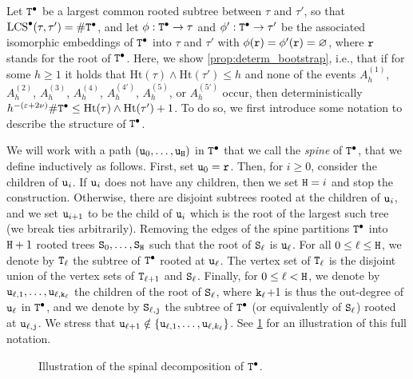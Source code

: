 \documentclass[11pt,reqno]{amsart}
\newcommand{\Ht}{\mathrm{Ht}}
\newcommand{\LCS}{\operatorname{LCS}}
\newcommand{\eps}{\varepsilon}
\renewcommand{\emptyset}{\varnothing}
\begin{document}
Let $\mathtt{T}^\bullet$ be a largest common rooted subtree between $\tau$ and $\tau'$, so that $\LCS^\bullet(\tau,\tau')=\#\ttT^\bullet$, and let $\phi:\mathtt{T}^\bullet\rightarrow \tau$ and $\phi':\mathtt{T}^\bullet\rightarrow \tau'$ be the associated isomorphic embeddings of $\mathtt{T}^\bullet$ into $\tau$ and $\tau'$ with $\phi(\ttr) = \phi'(\ttr) = \emptyset$, where $\mathtt{r}$ stands for the root of $\mathtt{T}^\bullet$. Here, we show \cref{prop:determ_bootstrap}, i.e., that if for some $h\geq 1$ it holds that $\Ht(\tau)\wedge\Ht(\tau')\leq h$ and none of the events $A_h^{(1)}$, $A_h^{(2)}$, $A_h^{(3)}$, $A_h^{(4)}$, $A_h^{(4')}$, $A_h^{(5)}$, or $A_h^{(5')}$ occur, then deterministically $h^{-(\eps+2\nu)}\#\ttT^\bullet \leq \Ht(\tau)\wedge\Ht(\tau')+1$. To do so, we first introduce some notation to describe the structure of $\mathtt{T}^\bullet$.

We will work with a path $(\mathtt{u}_0,\ldots,\mathtt{u}_{\mathtt{H}})$ in $\mathtt{T}^\bullet$ that we call the \emph{spine} of $\mathtt{T}^\bullet$, that we define inductively as follows. First, set $\mathtt{u}_0 = \mathtt{r}$. Then, for $i \geq 0$, consider the children of $\mathtt{u}_i$. If $\mathtt{u}_i$ does not have any children, then we set $\mathtt{H} = i$ and stop the construction. Otherwise, there are disjoint subtrees rooted at the children of $\mathtt{u}_i$, and we set $\mathtt{u}_{i+1}$ to be the child of $\mathtt{u}_i$ which is the root of the largest such tree (we break ties arbitrarily). Removing the edges of the spine partitions $\mathtt{T}^\bullet$ into $\mathtt{H}+1$ rooted trees $\mathtt{S}_0,\ldots,\mathtt{S}_{\mathtt{H}}$ such that the root of $\mathtt{S}_\ell$ is $\mathtt{u}_\ell$. For all $0\leq \ell \leq \mathtt{H}$, we denote by $\mathtt{T}_\ell$ the subtree of $\mathtt{T}^\bullet$ rooted at $\mathtt{u}_\ell$. The vertex set of $\mathtt{T}_\ell$ is the disjoint union of the vertex sets of $\mathtt{T}_{\ell+1}$ and $\mathtt{S}_\ell$. Finally, for $0 \le \ell < \mathtt{H}$, we denote by $\mathtt{u}_{\ell,1},\ldots,\mathtt{u}_{\ell,\mathtt{k}_\ell}$ the children of the root of $\mathtt{S}_\ell$, where $\mathtt{k}_\ell$+1 is thus the out-degree of $\mathtt{u}_\ell$ in $\mathtt{T}^\bullet$, and we denote by $\mathtt{S}_{\ell,\mathtt{j}}$ the subtree of $\mathtt{T}^\bullet$ (or equivalently of $\mathtt{S}_\ell$) rooted at $\mathtt{u}_{\ell,\mathtt{j}}$. We stress that $\mathtt{u}_{\ell+1} \notin \{\mathtt{u}_{\ell,1},\ldots,\mathtt{u}_{\ell,k_\ell}\}$. See \cref{fig:Tdot-spine} for an illustration of this full notation.

\begin{figure}
    \centering
    
    \caption{Illustration of the spinal decomposition of $\mathtt{T}^\bullet$.}
    \label{fig:Tdot-spine}
\end{figure}
\end{document}

